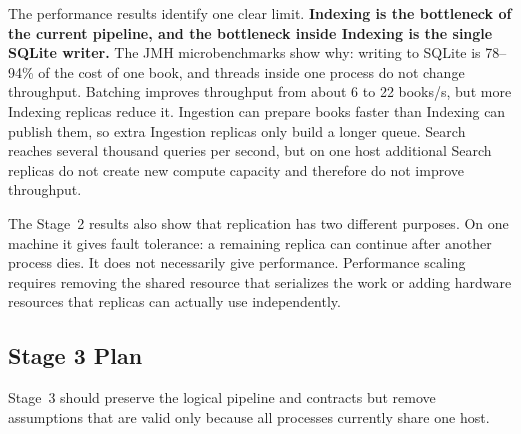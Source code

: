 \documentclass[12pt,a4paper]{article}
\begin{document}
The performance results identify one clear limit. \textbf{Indexing is the bottleneck of the current
pipeline, and the bottleneck inside Indexing is the single SQLite writer.} The JMH microbenchmarks show why: writing to SQLite is
78--94\% of the cost of one book, and threads inside one process do not change throughput. Batching
improves throughput from about 6 to 22 books/s, but more Indexing replicas reduce it. Ingestion can prepare
books faster than Indexing can publish them, so extra Ingestion replicas only build a longer queue.
Search reaches several thousand queries per second, but on one host additional Search replicas do
not create new compute capacity and therefore do not improve throughput.

The Stage~2 results also show that replication has two different purposes. On one machine it gives
fault tolerance: a remaining replica can continue after another process dies. It does not
necessarily give performance. Performance scaling requires removing the shared resource that
serializes the work or adding hardware resources that replicas can actually use independently.

\subsection{Stage 3 Plan}

Stage~3 should preserve the logical pipeline and contracts but remove assumptions that are valid
only because all processes currently share one host.
\end{document}
